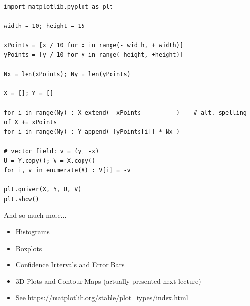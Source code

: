 \begin{frame}[fragile]
%
\begin{codebox}
\begin{verbatim}
import matplotlib.pyplot as plt

width = 10; height = 15

xPoints = [x / 10 for x in range(- width, + width)]
yPoints = [y / 10 for y in range(-height, +height)]

Nx = len(xPoints); Ny = len(yPoints)

X = []; Y = []

for i in range(Ny) : X.extend(  xPoints          )    # alt. spelling of X += xPoints
for i in range(Ny) : Y.append( [yPoints[i]] * Nx )

# vector field: v = (y, -x)
U = Y.copy(); V = X.copy()
for i, v in enumerate(V) : V[i] = -v

plt.quiver(X, Y, U, V)
plt.show()
\end{verbatim}
\end{codebox}
%
\end{frame}


\begin{frame}{And so much more...}
%
\begin{itemize}
\item Histograms
\item Boxplots
\item Confidence Intervals and Error Bars
\item 3D Plots and Contour Maps (actually presented next lecture)
\item See \url{https://matplotlib.org/stable/plot_types/index.html}
\end{itemize}
%
\end{frame}